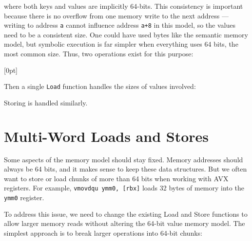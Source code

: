 
\noindent where both keys and values are implicitly 64-bits.
This consistency is important because there is no overflow from one memory write to the next address --- writing to address \texttt{a} cannot influence address \texttt{a+8} in this model, so the values need to be a consistent size.
One could have used bytes like the semantic memory model, but symbolic execution is far simpler when everything uses 64 bits, the most common size.
Thus, two operations exist for this purpose:


[0pt]

Then a single \texttt{Load} function handles the sizes of values involved:


Storing is handled similarly.

\section{Multi-Word Loads and Stores}
\label{sec:multi-word}

Some aspects of the memory model should stay fixed.
Memory addresses should always be 64 bits, and it makes sense to keep these data structures.
But we often want to store or load chunks of more than 64 bits when working with AVX registers.
For example, \texttt{vmovdqu ymm0, [rbx]} loads 32 bytes of memory into the \texttt{ymm0} register.

To address this issue, we need to change the existing Load and Store functions to allow larger memory reads without altering the 64-bit value memory model.
The simplest approach is to break larger operations into 64-bit chunks:

